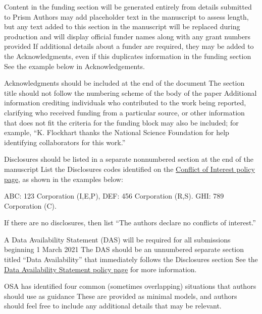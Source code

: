 \documentclass{osa-article}
\begin{document}
\begin{backmatter}
Content in the funding section will be generated entirely from details submitted to Prism
Authors may add placeholder text in the manuscript to assess length, but any text added to this section in the manuscript will be replaced during production and will display official funder names along with any grant numbers provided
If additional details about a funder are required, they may be added to the Acknowledgments, even if this duplicates information in the funding section
See the example below in Acknowledgements.

Acknowledgments should be included at the end of the document
The section title should not follow the numbering scheme of the body of the paper
Additional information crediting individuals who contributed to the work being reported, clarifying who received funding from a particular source, or other information that does not fit the criteria for the funding block may also be included; for example, ``K. Flockhart thanks the National Science Foundation for help identifying collaborators for this work.''

Disclosures should be listed in a separate nonnumbered section at the end of the manuscript
List the Disclosures codes identified on the \href{https://opg.optica.org/submit/review/conflicts-interest-policy.cfm}{Conflict of Interest policy page}, as shown in the examples below:

\medskip

\noindent ABC: 123 Corporation (I,E,P), DEF: 456 Corporation (R,S). GHI: 789 Corporation (C).

\medskip

\noindent If there are no disclosures, then list ``The authors declare no conflicts of interest.''


A Data Availability Statement (DAS) will be required for all submissions beginning 1 March 2021
The DAS should be an unnumbered separate section titled ``Data Availability'' that
immediately follows the Disclosures section
See the \href{https://www.osapublishing.org/submit/review/data-availability-policy.cfm}{Data Availability Statement policy page} for more information.

OSA has identified four common (sometimes overlapping) situations that authors should use as guidance
These are provided as minimal models, and authors should feel free to
include any additional details that may be relevant.


\end{backmatter}
\end{document}
